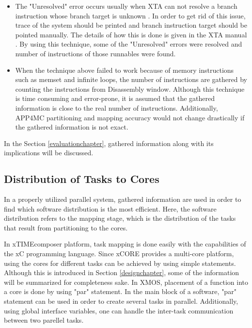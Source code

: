 \begin{itemize}
	\item The "Unresolved" error occurs usually when XTA can not resolve a branch instruction whose branch target is unknown \cite{xtamanual}. In order to get rid of this issue, trace of the system should be printed and branch instruction target should be pointed manually. The details of how this is done is given in the XTA manual \cite{xtamanual}. By using this technique, some of the "Unresolved" errors were resolved and number of instructions of those runnables were found.

	\item When the technique above failed to work because of memory instructions such as memset and infinite loops, the number of instructions are gathered by counting the instructions from Disassembly window. Although this technique is time consuming and error-prone, it is assumed that the gathered information is close to the real number of instructions. Additionally, APP4MC partitioning and mapping accuracy would not change drastically if the gathered information is not exact. 
\end{itemize}

In the Section \ref{evaluationchapter}, gathered information along with its implications will be discussed.

\subsection{Distribution of Tasks to Cores}
In a properly utilized parallel system, gathered information are used in order to find which software distribution is the most efficient. Here, the software distribution refers to the mapping stage, which is the distribution of the tasks that result from partitioning to the cores.

In xTIMEcomposer platform, task mapping is done easily with the capabilities of the xC programming language. Since xCORE provides a multi-core platform, using the cores for different tasks can be achieved by using simple statements. Although this is introduced in Section \ref{designchapter}, some of the information will be summarized for completeness sake. In XMOS, placement of a function into a core is done by using "par" statement. In the main block of a software, "par" statement can be used in order to create several tasks in parallel. Additionally, using global interface variables, one can handle the inter-task communication between two parellel tasks.

